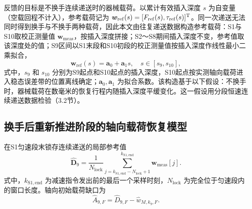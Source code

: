 \documentclass{JQRnew}
\begin{document}
反馈的目标是不换手连续递送时的器械载荷。以累计有效插入深度 $s$ 为自变量（空载回程不计入），参考载荷记为 $\bm w_{\mathrm{ref}}(s)=[F_{\mathrm{ref}}(s),\tau_{\mathrm{ref}}(s)]^{\rm T}$。同一次递送无法同时得到换手与不换手两种载荷，因此本文由往复递送数据构造参考载荷：S1与S10取校正测量值 $\bm w_{\mathrm{meas}}$，按插入深度拼接；S2～S8期间插入深度不变，参考值取该深度处的值；S9区间以S1末段和S10初段的校正测量值按插入深度作线性最小二乘拟合，
\begin{equation}
\label{eq:reference}
\bm w_{\mathrm{ref}}(s)=\bm a_0+\bm a_1s,\quad s\in[s_9,s_{10}],
\end{equation}
式中，$s_9$ 和 $s_{10}$ 分别为S9起点和S10起点的插入深度，S10起点按实测轴向载荷进入稳态误差带的位置离线确定；$\bm a_0,\bm a_1$ 为拟合系数。该构造基于以下假设：不换手时，器械载荷在数毫米的恢复行程内随插入深度平缓变化。这一假设用分段恒速连续递送数据检验（3.2节）。

\begin{figure}[H]
\centering
{}
\label{fig2}
\end{figure}

\subsection{换手后重新推进阶段的轴向载荷恢复模型}

在S1匀速段末锁存连续递送的局部参考值
\begin{equation}
\label{eq:lock}
\widehat{\bm D}_9=\frac{1}{N_{\mathrm{lock}}}
\sum_{j=k_{\mathrm{S1,end}}-N_{\mathrm{lock}}+1}^{k_{\mathrm{S1,end}}}
\bm w_{\mathrm{meas}}[j].
\end{equation}
式中，$k_{\mathrm{S1,end}}$ 为减速指令发出前的最后一个采样时刻，$N_{\mathrm{lock}}$ 为完全位于匀速段内的窗口长度。轴向初始载荷缺口为
\begin{equation}
\label{eq:deficit}
\widehat A_{9,F}=\widehat D_{9,F}-\widehat w_{M,k_9,F}.
\end{equation}
\end{document}
